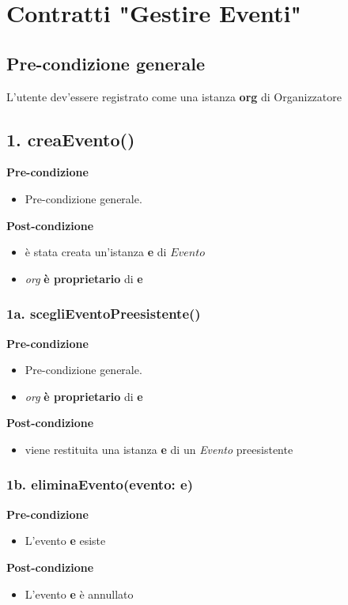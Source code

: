 \documentclass[14pt]{extarticle}
\begin{document}
\section{Contratti "Gestire Eventi"}
\subsection*{Pre-condizione generale}

L'utente dev'essere registrato come una istanza \textbf{org} di Organizzatore

\subsection*{1. creaEvento()}

\textbf{Pre-condizione}
\begin{itemize}
  \item Pre-condizione generale.
\end{itemize}
\textbf{Post-condizione}
\begin{itemize}
  \item è stata creata un'istanza \textbf{e} di $Evento$
  \item \textit{org} \textbf{è proprietario} di \textbf{e}
\end{itemize}

\subsubsection*{1a. scegliEventoPreesistente()}
\textbf{Pre-condizione}
\begin{itemize}
  \item Pre-condizione generale.
  \item \textit{org} \textbf{è proprietario} di \textbf{e}
\end{itemize}
\textbf{Post-condizione}
\begin{itemize}
  \item viene restituita una istanza \textbf{e} di un \textit{Evento} preesistente
\end{itemize}

\subsubsection*{1b. eliminaEvento(evento: e)}

\textbf{Pre-condizione}
\begin{itemize}
  \item L'evento \textbf{e} esiste
\end{itemize}
\textbf{Post-condizione}
\begin{itemize}
  \item L'evento \textbf{e} è annullato
\end{itemize}
\end{document}
